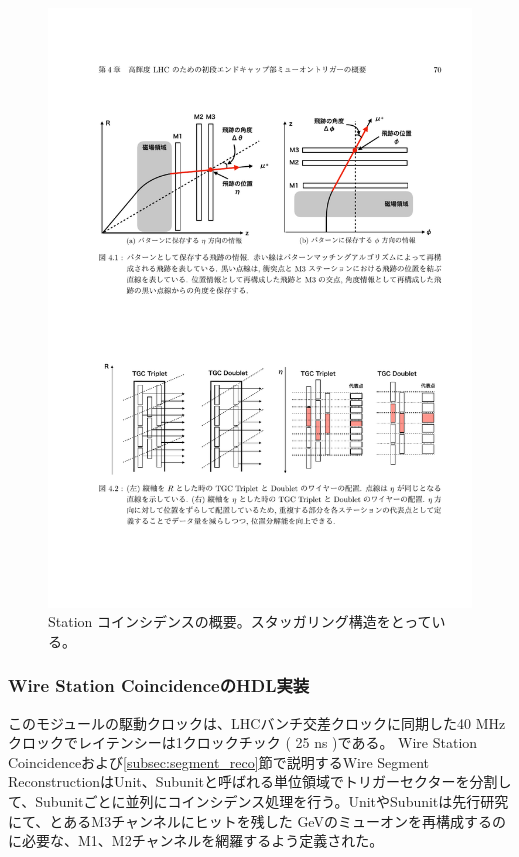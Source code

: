 \begin{figure} 
\centering
\includegraphics[width=16cm]{fig/SL/Concept_station.pdf}
\caption[Station コインシデンスの概要]{Station コインシデンスの概要\cite{mt_mino}。スタッガリング構造をとっている。}
\label{Concept_station}
\end{figure}

\subsubsection*{Wire Station CoincidenceのHDL実装}
このモジュールの駆動クロックは、LHCバンチ交差クロックに同期した40 MHzクロックでレイテンシーは1クロックチック ( 25 ns )である。
Wire Station Coincidenceおよび\ref{subsec:segment_reco}節で説明するWire Segment ReconstructionはUnit、Subunitと呼ばれる単位領域でトリガーセクターを分割して、Subunitごとに並列にコインシデンス処理を行う。UnitやSubunitは先行研究にて、とあるM3チャンネルにヒットを残した GeVのミューオンを再構成するのに必要な、M1、M2チャンネルを網羅するよう定義された。

